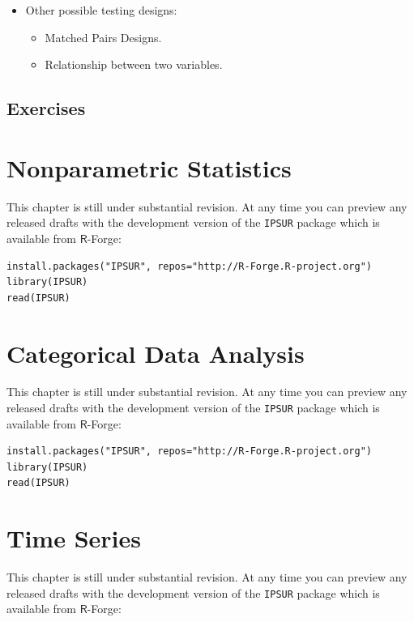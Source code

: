 \documentclass[captions=tableheading]{scrbook}
\begin{document}
\begin{example}
\begin{rem}
\end{rem}

\begin{itemize}
\item Other possible testing designs:
\begin{itemize}
\item Matched Pairs Designs.
\item Relationship between two variables.
\end{itemize}
\end{itemize}

\newpage{}
\section{Exercises}
\label{sec-13-5}

\setcounter{thm}{0}
\chapter{Nonparametric Statistics}
\label{sec-14}
\label{cha-Nonparametric-Statistics}


This chapter is still under substantial revision. At any time you can preview any released drafts with the development version of the \texttt{IPSUR} package which is available from \(\mathsf{R}\)-Forge:


\begin{verbatim}
install.packages("IPSUR", repos="http://R-Forge.R-project.org")
library(IPSUR)
read(IPSUR)
\end{verbatim}
\chapter{Categorical Data Analysis}
\label{sec-15}
\label{cha-Categorical-Data-Analysis}


This chapter is still under substantial revision. At any time you can preview any released drafts with the development version of the \texttt{IPSUR} package which is available from \(\mathsf{R}\)-Forge:


\begin{verbatim}
install.packages("IPSUR", repos="http://R-Forge.R-project.org")
library(IPSUR)
read(IPSUR)
\end{verbatim}
\chapter{Time Series}
\label{sec-16}
\label{cha-Time-Series}


This chapter is still under substantial revision. At any time you can preview any released drafts with the development version of the \texttt{IPSUR} package which is available from \(\mathsf{R}\)-Forge:



\end{example}
\end{document}
